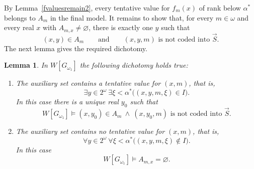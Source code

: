 \documentclass[a4paper,11pt]{article}
\newtheorem{lemma}[theorem]{Lemma}
\begin{document}
By Lemma~\ref{fvaluesremain2}, every tentative value for $f_m(x)$ of rank below $\alpha^\ast$ belongs to $A_m$ in the final model.  It remains to show that, for every $m\in\omega$ and every real $x$ with $A_{m,x}\neq\varnothing$, there is exactly one $y$ such that
\[
   (x,y)\in A_m
   \qquad\text{and}\qquad
   (x,y,m)\text{ is not coded into }\vec S.
\]
The next lemma gives the required dichotomy.

\begin{lemma}
In $W[G_{\omega_1}]$ the following dichotomy holds true:
\begin{enumerate}
\item The auxiliary set contains a tentative value for $(x,m)$, that is,
\[
   \exists y\in2^\omega\ \exists\xi<\alpha^\ast
   \bigl((x,y,m,\xi)\in I\bigr).
\]
In this case there is a unique real $y_0$ such that
\[
   W[G_{\omega_1}]\models
   (x,y_0)\in A_m
   \ \wedge\ 
   (x,y_0,m)\text{ is not coded into }\vec S.
\]

\item The auxiliary set contains no tentative value for $(x,m)$, that is,
\[
   \forall y\in2^\omega\ \forall\xi<\alpha^\ast
   \bigl((x,y,m,\xi)\notin I\bigr).
\]
In this case
\[
   W[G_{\omega_1}]\models A_{m,x}=\varnothing.
\]
\end{enumerate}
\end{lemma}
\end{document}
